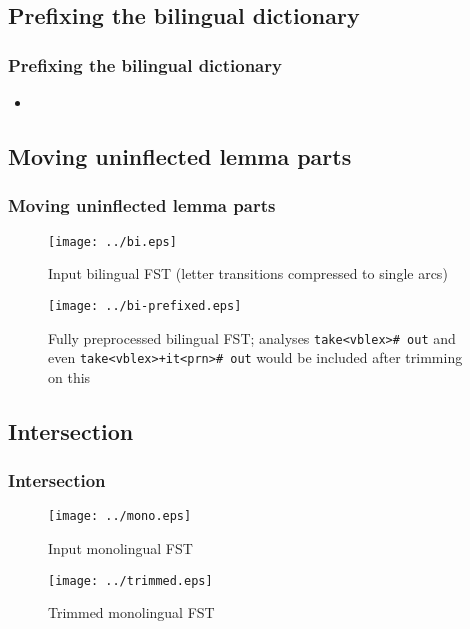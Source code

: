 \documentclass[notes=hide]{beamer}
\newcommand{\ana}[1]{\texttt{#1}}
\begin{document}
\subsection{Prefixing the bilingual dictionary}
\begin{frame}
  \frametitle{Prefixing the bilingual dictionary}
  \begin{itemize}
  \item
  \end{itemize}
\end{frame}

\subsection{Moving uninflected lemma parts}
\begin{frame}
  \frametitle{Moving uninflected lemma parts}

\begin{figure}[h]
  \begin{center}
    \texttt{[image: ../bi.eps]}
    \caption{Input bilingual FST (letter transitions compressed to single arcs)}
    \label{fig:bi-prefixed}
  \end{center}
\end{figure}

\begin{figure}[h]
  \begin{center}
    \texttt{[image: ../bi-prefixed.eps]}
    \caption{Fully preprocessed bilingual FST; analyses \ana{take<vblex>\# out} and even \ana{take<vblex>+it<prn>\# out}    would be included after trimming on this}
    \label{fig:bi-prefixed}
  \end{center}
\end{figure}

\end{frame}

\subsection{Intersection}
\begin{frame}
  \frametitle{Intersection}

  \begin{figure}[h]
    \begin{center}
      \texttt{[image: ../mono.eps]}
      \caption{Input monolingual FST}
      \label{fig:mono}
    \end{center}
  \end{figure}

  \begin{figure}[h]
    \begin{center}
      \texttt{[image: ../trimmed.eps]}
      \caption{Trimmed monolingual FST}
      \label{fig:trimmed}
    \end{center}
  \end{figure}

\end{frame}
\end{document}

